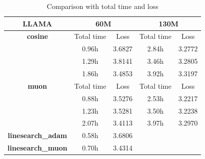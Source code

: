 \begin{table}[htbp]
\centering
\begin{tabular}{c|c|c|c|c}
\hline
\textbf{LLAMA} & \multicolumn{2}{c|}{60M} & \multicolumn{2}{c}{130M} \\
\hline

\textbf{cosine} & Total time & Loss & Total time & Loss \\
\hline
 & 0.96h & 3.6827 & 2.84h & 3.2772 \\
\hline
 & 1.29h & 3.8141 & 3.46h & 3.2805 \\
\hline
 & 1.86h & 3.4853 & 3.92h & 3.3197 \\
\hline

\textbf{muon} & Total time & Loss & Total time & Loss \\
\hline
 & 0.88h & 3.5276 & 2.53h & 3.2217 \\
\hline
 & 1.23h & 3.5281 & 3.50h & 3.2238 \\
\hline
 & 2.07h & 3.4113 & 3.97h & 3.2970 \\
\hline

\textbf{linesearch_adam} & 0.58h & 3.6806 &  &  \\
\hline
\textbf{linesearch_muon} & 0.70h & 3.4314 &  &  \\
\hline
\end{tabular}
\caption{Comparison with total time and loss}
\end{table}
